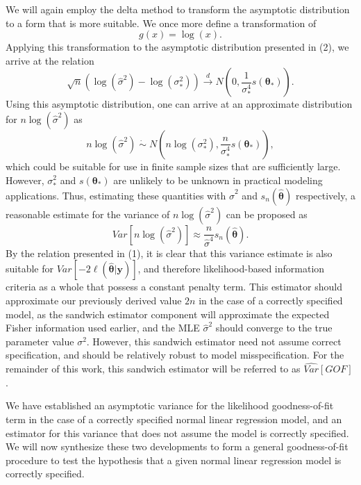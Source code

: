 \documentclass[review]{elsarticle}
\begin{document}
		We will again employ the delta method to transform the asymptotic distribution to a form that is more suitable. We once more define a transformation of
		\begin{equation*}
			g(x) = \log(x) .
		\end{equation*}
		Applying this transformation to the asymptotic distribution presented in (2), we arrive at the relation
		\begin{equation*}
			\sqrt{n} ( \log (\hat{\sigma}^2) - \log(\sigma_*^2)) \xrightarrow[]{d} N \left( 0, \frac{1}{\sigma_*^4} s(\bm{\theta}_*) \right) .
		\end{equation*}
		Using this asymptotic distribution, one can arrive at an approximate distribution for $n\log(\hat{\sigma}^2)$ as
		\begin{equation*}
			n\log(\hat{\sigma}^2) \; \dot\sim \; N \left( n\log(\sigma_* ^2), \frac{n}{\sigma_*^4} s(\bm{\theta}_*) \right) ,
		\end{equation*}
		which could be suitable for use in finite sample sizes that are sufficiently large. However, $\sigma_*^2$ and $s(\bm{\theta}_*)$ are unlikely to be unknown in practical modeling
		applications. Thus, estimating these quantities with $\hat{\sigma}^2$ and $s_n(\hat{\bm{\theta}})$ respectively, a reasonable estimate for the variance of $n\log(\hat{\sigma}^2)$ can
		be proposed as
		\begin{equation*}
			Var \left[ n\log(\hat{\sigma}^2) \right] \approx \frac{n}{\hat{\sigma}^4} s_n(\hat{\bm{\theta}}) .
		\end{equation*}
		By the relation presented in (1), it is clear that this variance estimate is also suitable for $Var \left[ -2 \ell (\hat{\bm{\theta}} | \bm{y} ) \right]$, and therefore
		likelihood-based information criteria as a whole that possess a constant penalty term. This estimator should approximate our previously derived value $2n$ in the case of a correctly
		specified model, as the sandwich estimator component will approximate the expected Fisher information used earlier, and the MLE $\hat{\sigma}^2$ should converge to the true
		parameter value $\sigma^2$. However, this sandwich estimator need not assume correct specification, and should be relatively robust to model misspecification. For the remainder of this work, this sandwich estimator will be referred to as $\widehat{Var}[GOF]$.

		We have established an asymptotic variance for the likelihood goodness-of-fit term in the case of a correctly specified normal linear regression model, and an
		estimator for this variance that does not assume the model is correctly specified. We will now synthesize these two developments to form a general goodness-of-fit procedure to
		test the hypothesis that a given normal linear regression model is correctly specified.
\end{document}
